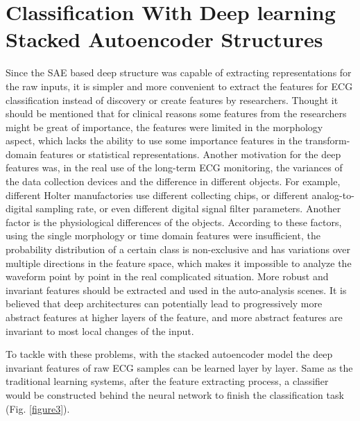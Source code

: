 \documentclass[journal]{IEEEtran}
\begin{document}




\section{Classification With Deep learning Stacked Autoencoder Structures}
Since the SAE based deep structure was capable of extracting representations for the raw inputs, it is simpler and more convenient to extract the features for ECG classification instead of discovery or create features by researchers. Thought it should be mentioned that for clinical reasons some features from the researchers might be great of importance, the features were limited in the morphology aspect, which lacks the ability to use some importance features in the transform-domain features or statistical representations. Another motivation for the deep features was, in the real use of the long-term ECG monitoring, the variances of the data collection devices and the difference in different objects. For example, different Holter manufactories use different collecting chips, or different analog-to-digital sampling rate, or even different digital signal filter parameters. Another factor is the physiological differences of the objects. According to these factors, using the single morphology or time domain features were insufficient, the probability distribution of a certain class is non-exclusive and has variations over multiple directions in the feature space, which makes it impossible to analyze the waveform point by point in the real complicated situation. More robust and invariant features should be extracted and used in the auto-analysis scenes. It is believed that deep architectures can potentially lead to progressively more abstract features at higher layers of the feature, and more abstract features are invariant to most local changes of the input\cite{bengio2013representation}.

To tackle with these problems, with the stacked autoencoder model the deep invariant features of raw ECG samples can be learned layer by layer. Same as the traditional learning systems, after the feature extracting process, a classifier would be constructed behind the neural network to finish the classification task (Fig. \ref{figure3}). 
\end{document}
